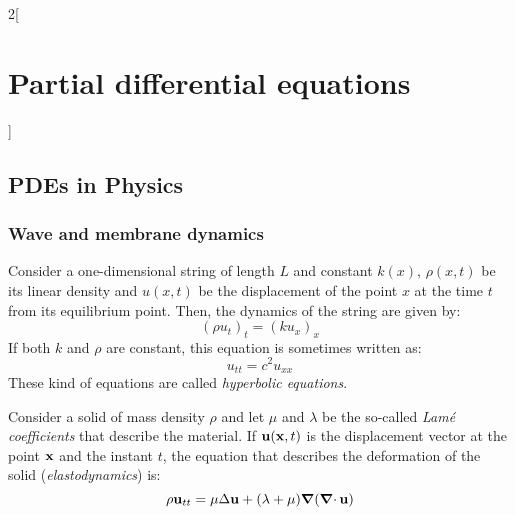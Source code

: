\documentclass[../../../main_math.tex]{subfiles}
\begin{document}
\begin{multicols}{2}[\section{Partial differential equations}]
  \subsection{PDEs in Physics}
  \subsubsection{Wave and membrane dynamics}
  \begin{proposition}
    Consider a one-dimensional string of length $L$ and constant $k(x)$, $\rho(x,t)$ be its linear density and $u(x,t)$ be the displacement of the point $x$ at the time $t$ from its equilibrium point. Then, the dynamics of the string are given by: $${(\rho u_{t})}_t={(ku_x)}_x$$ If both $k$ and $\rho$ are constant, this equation is sometimes written as:
    \begin{equation}
      u_{tt}=c^2u_{xx}
    \end{equation}
    These kind of equations are called \emph{hyperbolic equations}.
  \end{proposition}
  \begin{proposition}
    Consider a solid of mass density $\rho$ and let $\mu$ and $\lambda$ be the so-called \emph{Lamé coefficients} that describe the material. If $\boldsymbol{\mathrm{u}}(\boldsymbol{\mathrm{x}},t)$ is the displacement vector at the point $\boldsymbol{\mathrm{x}}$ and the instant $t$, the equation that describes the deformation of the solid (\emph{elastodynamics}) is:
    $$\rho\boldsymbol{\mathrm{u}}_{tt}=\mu\Delta\boldsymbol{\mathrm{u}}+(\lambda+\mu)\grad(\operatorname{\boldsymbol{\mathrm{\nabla}}\cdot}{\boldsymbol{\mathrm{u}}})$$
  \end{proposition}

\end{multicols}
\end{document}
